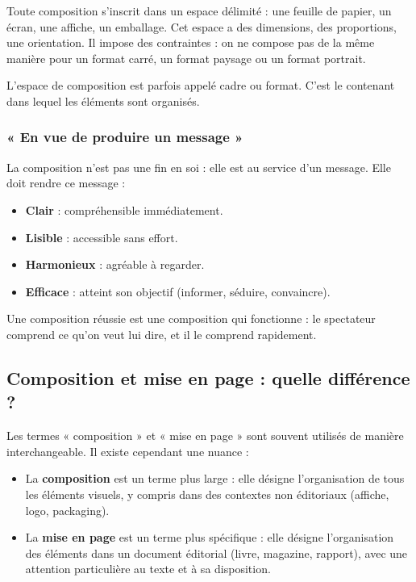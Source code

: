 Toute composition s'inscrit dans un espace délimité : une feuille de papier, un écran, une affiche, un emballage. Cet espace a des dimensions, des proportions, une orientation. Il impose des contraintes : on ne compose pas de la même manière pour un format carré, un format paysage ou un format portrait.

L'espace de composition est parfois appelé cadre ou format. C'est le contenant dans lequel les éléments sont organisés.

\subsubsection{« En vue de produire un message »}

La composition n'est pas une fin en soi : elle est au service d'un message. Elle doit rendre ce message :
\begin{itemize}
  \item \textbf{Clair} : compréhensible immédiatement.
  \item \textbf{Lisible} : accessible sans effort.
  \item \textbf{Harmonieux} : agréable à regarder.
  \item \textbf{Efficace} : atteint son objectif (informer, séduire, convaincre).
\end{itemize}

Une composition réussie est une composition qui fonctionne : le spectateur comprend ce qu'on veut lui dire, et il le comprend rapidement.

\subsection{Composition et mise en page : quelle différence ?}

Les termes « composition » et « mise en page » sont souvent utilisés de manière interchangeable. Il existe cependant une nuance :
\begin{itemize}
  \item La \textbf{composition} est un terme plus large : elle désigne l'organisation de tous les éléments visuels, y compris dans des contextes non éditoriaux (affiche, logo, packaging).
  \item La \textbf{mise en page} est un terme plus spécifique : elle désigne l'organisation des éléments dans un document éditorial (livre, magazine, rapport), avec une attention particulière au texte et à sa disposition.
\end{itemize}


